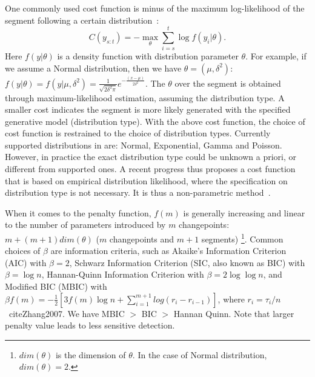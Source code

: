 One commonly used cost function is minus of the maximum log-likelihood of the segment following a certain distribution~\cite{Killick2011,Horvath1993,Chen2001}:
\begin{equation*}
C(y_{s:t}) = - \max_\theta \sum_{i=s}^t \log f(y_i|\theta).
\end{equation*}
Here $f(y|\theta)$ is a density function with distribution parameter $\theta$. 
For example, if we assume a Normal distribution, then we have $\theta = (\mu, \delta^2)$:
$f(y|\theta) = f(y|\mu, \delta^2) = \frac{1}{\sqrt{2\delta^2\pi}} e^{-\frac{(x-\mu)}{2\delta^2}}$.
The $\theta$ over the segment is obtained through maximum-likelihood estimation, assuming the distribution type.
A smaller cost indicates the segment is more likely generated with the specified generative model (distribution type).
With the above cost function, the choice of cost function is restrained to the choice of distribution types.
Currently supported distributions in \cite{Killick2013a} are: Normal, Exponential, Gamma and Poisson.
However, in practice the exact distribution type could be unknown a priori, or different from supported ones.
A recent progress thus proposes a cost function that is based on empirical distribution likelihood, where the specification on distribution type is not necessary. It is thus a non-parametric method~\cite{Haynes2016}. 

When it comes to the penalty function, $f(m)$ is generally increasing and linear to the number of parameters introduced by $m$ changepoints: 
$m + (m+1)dim(\theta)$ ($m$ changepoints and $m+1$ segments) \footnote{$dim(\theta)$ is the dimension of $\theta$. In the case of Normal distribution, $dim(\theta) = 2$.}.
Common choices of $\beta$ are information criteria, such as Akaike’s Information Criterion (AIC) with $\beta=2$, Schwarz Information Criterion (SIC, also known as BIC) with $\beta=\log n$, Hannan-Quinn Information Criterion with $\beta = 2 \log \log n$, and Modified BIC (MBIC) with 
$\beta f(m) = -\frac{1}{2} [3f(m)\log n + \sum_{i=1}^{m+1} log(r_i - r_{i-1})]$, where $r_i = \tau_i/n$~cite{Zhang2007}.
We have MBIC $>$ BIC $>$ Hannan Quinn. Note that larger penalty value leads to less sensitive detection.

